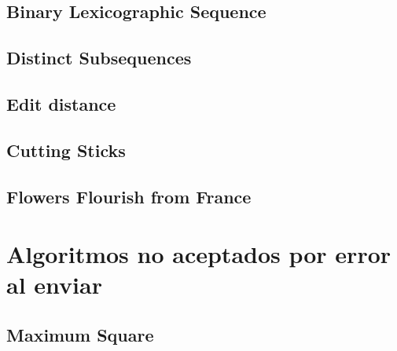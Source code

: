 \newpage
\section{Binary Lexicographic Sequence}


\newpage
\section{Distinct Subsequences} \label{code_distinct_subsecuences}


\newpage
\section{Edit distance}


\newpage
\section{Cutting Sticks}


\newpage
\section{Flowers Flourish from France}



\chapter{Algoritmos no aceptados por error al enviar}


\newpage
\section{Maximum Square}
